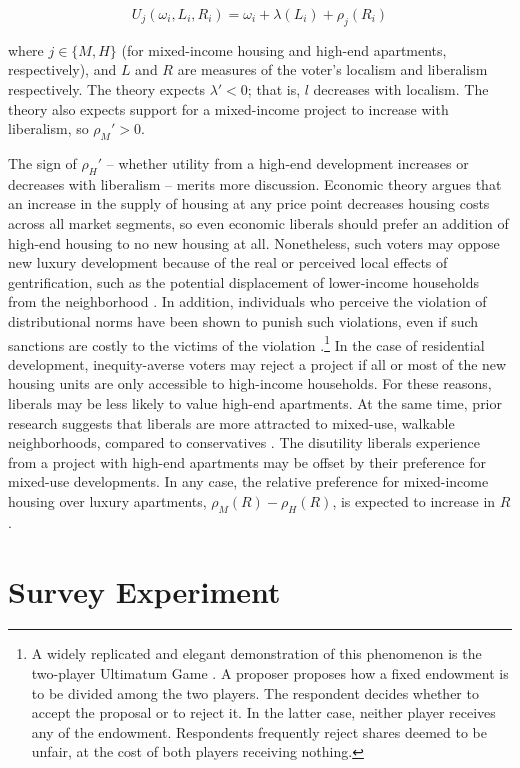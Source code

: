 \documentclass[article,11pt]{memoir}
\begin{document}
\[
U_j(\omega_i, L_i, R_i) = \omega_i + \lambda(L_i) + \rho_j(R_i)
\]

\noindent where $j \in \{M, H\}$ (for mixed-income housing and high-end apartments, respectively), and $L$ and $R$ are measures of the voter's localism and liberalism respectively.  The theory expects $\lambda' < 0$; that is, $l$ decreases with localism.  The theory also expects support for a mixed-income project to increase with liberalism, so $\rho_M' > 0$.  

The sign of $\rho_H'$ -- whether utility from a high-end development increases or decreases with liberalism -- merits more discussion.  Economic theory argues that an increase in the supply of housing at any price point decreases housing costs across all market segments, so even economic liberals should prefer an addition of high-end housing to no new housing at all.  Nonetheless, such voters may oppose new luxury development because of the real or perceived local effects of gentrification, such as the potential displacement of lower-income households from the neighborhood \citep{hankinson_when_2018}. In addition, individuals who perceive the violation of distributional norms have been shown to punish such violations, even if such sanctions are costly to the victims of the violation \citep{fehr_third-party_2004}.\footnote{A widely replicated and elegant demonstration of this phenomenon is the two-player Ultimatum Game \citep{henrich_does_2000}. A proposer proposes how a fixed endowment is to be divided among the two players. The respondent decides whether to accept the proposal or to reject it. In the latter case, neither player receives any of the endowment. Respondents frequently reject shares deemed to be unfair, at the cost of both players receiving nothing.}  In the case of residential development, inequity-averse voters may reject a project if all or most of the new housing units are only accessible to high-income households. For these reasons, liberals may be less likely to value high-end apartments. At the same time, prior research suggests that liberals are more attracted to mixed-use, walkable neighborhoods, compared to conservatives \citep{lewis_complexity_2010}.  The disutility liberals experience from a project with high-end apartments may be offset by their preference for mixed-use developments.  In any case, the relative preference for mixed-income housing over luxury apartments, $\rho_M(R) - \rho_H(R)$, is expected to increase in $R$.

\section{Survey Experiment}\label{sec:exp}
\end{document}
